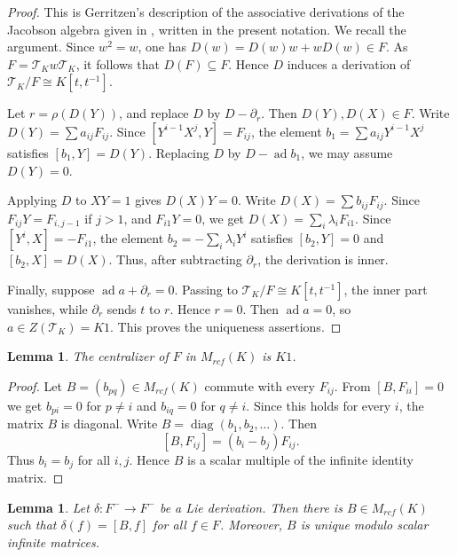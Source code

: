 \documentclass[11pt]{article}
\numberwithin{equation}{section}
\theoremstyle{plain}
\newtheorem{lemma}[theorem]{Lemma}
\theoremstyle{definition}
\numberwithin{equation}{section}
\newcommand{\T}{\mathscr T_K}
\begin{document}
\begin{proof}
This is Gerritzen's description of the associative derivations of the Jacobson algebra given in \cite[Proposition~7.4 and Corollary~7.5]{Gerritzen2000}, written in the present notation. We recall the argument. Since $w^2=w$, one has $D(w)=D(w)w+wD(w)\in F$. As $F=\T w\T$, it follows that $D(F)\subseteq F$. Hence $D$ induces a derivation of $\T/F\cong K[t,t^{-1}]$.

Let $r=\rho(D(Y))$, and replace $D$ by $D-\partial_r$. Then $D(Y),D(X)\in F$. Write $D(Y)=\sum a_{ij}F_{ij}$. Since $[Y^{i-1}X^j,Y]=F_{ij}$, the element $b_1=\sum a_{ij}Y^{i-1}X^j$ satisfies $[b_1,Y]=D(Y)$. Replacing $D$ by $D-\operatorname{ad}b_1$, we may assume $D(Y)=0$.

Applying $D$ to $XY=1$ gives $D(X)Y=0$. Write $D(X)=\sum b_{ij}F_{ij}$. Since $F_{ij}Y=F_{i,j-1}$ if $j>1$, and $F_{i1}Y=0$, we get $D(X)=\sum_i\lambda_iF_{i1}$. Since $[Y^i,X]=-F_{i1}$, the element $b_2=-\sum_i\lambda_iY^i$ satisfies $[b_2,Y]=0$ and $[b_2,X]=D(X)$. Thus, after subtracting $\partial_r$, the derivation is inner.

Finally, suppose $\operatorname{ad}a+\partial_r=0$. Passing to $\T/F\cong K[t,t^{-1}]$, the inner part vanishes, while $\partial_r$ sends $t$ to $r$. Hence $r=0$. Then $\operatorname{ad}a=0$, so $a\in Z(\T)=K1$. This proves the uniqueness assertions.
\end{proof}

\begin{lemma}\label{lem:centralizer-F-rcf}
The centralizer of $F$ in $M_{rcf}(K)$ is $K1$.
\end{lemma}

\begin{proof}
Let $B=(b_{pq})\in M_{rcf}(K)$ commute with every $F_{ij}$. From $[B,F_{ii}]=0$ we get $b_{pi}=0$ for $p\neq i$ and $b_{iq}=0$ for $q\neq i$. Since this holds for every $i$, the matrix $B$ is diagonal. Write $B=\operatorname{diag}(b_1,b_2,\ldots)$. Then
$$
[B,F_{ij}]=(b_i-b_j)F_{ij}.
$$
Thus $b_i=b_j$ for all $i,j$. Hence $B$ is a scalar multiple of the infinite identity matrix.
\end{proof}


\begin{lemma}\label{lem:finitary-lie-derivations}
Let $\delta:F^-\to F^-$ be a Lie derivation. Then there is $B\in M_{rcf}(K)$ such that $\delta(f)=[B,f]$ for all $f\in F$. Moreover, $B$ is unique modulo scalar infinite matrices.
\end{lemma}
\end{document}
